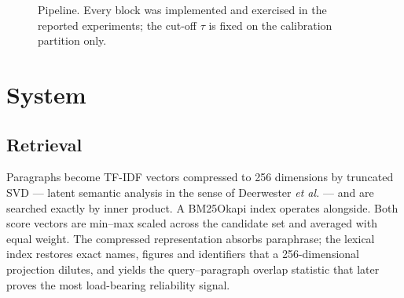 \documentclass[conference]{IEEEtran}
\begin{document}
\begin{figure}[!t]
\centering\scriptsize
\setlength{\fboxsep}{3.5pt}
\caption{Pipeline. Every block was implemented and exercised in the reported
experiments; the cut-off $\tau$ is fixed on the calibration partition only.}
\label{fig:arch}
\end{figure}

\section{System}
\subsection{Retrieval}
Paragraphs become TF-IDF vectors compressed to 256 dimensions by truncated SVD ---
latent semantic analysis in the sense of Deerwester \emph{et al.}
\cite{deerwester1990} --- and are searched exactly by inner product. A BM25Okapi
index \cite{robertson2009} operates alongside. Both score vectors are min--max
scaled across the candidate set and averaged with equal weight. The compressed
representation absorbs paraphrase; the lexical index restores exact names, figures
and identifiers that a 256-dimensional projection dilutes, and yields the
query--paragraph overlap statistic that later proves the most load-bearing
reliability signal.
\end{document}

